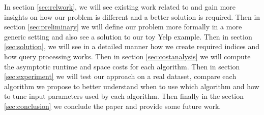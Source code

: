 In section \ref{sec:relwork}, we will see existing work related to {\rrp} and gain more insights on how our problem is different and a better solution is required. Then in section \ref{sec:preliminary} we will define our problem more formally in a more generic setting and also see a solution to our toy Yelp example. Then in section \ref{sec:solution}, we will see in a detailed manner how we create required indices and how query processing works. Then in section \ref{sec:costanalysis} we will compute the asymptotic runtime and space costs for each algorithm. Then in section \ref{sec:experiment} we will test our approach on a real dataset, compare each algorithm we propose to better understand when to use which algorithm and how to tune input parameters used by each algorithm. Then finally in the section \ref{sec:conclusion} we conclude the paper and provide some future work.